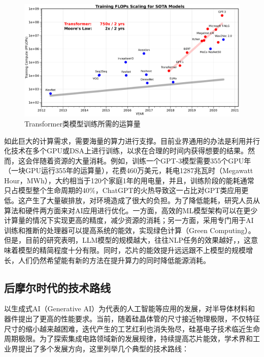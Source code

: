 \begin{figure}[htb]
    \centering
    \includegraphics[width=\textwidth]{figs/AI-Fig-ai_and_compute.pdf}
    \caption{Transformer类模型训练所需的运算量}
    \label{AI:ai_and_compute}
\end{figure}


如此巨大的计算需求，需要海量的算力进行支撑。目前业界通用的办法是利用并行化技术在多个GPU或DSA上进行训练，以求在合理的时间内获得想要的结果。然而，这会伴随着资源的大量消耗。例如，训练一个GPT-3模型需要355个GPU年（一块GPU运行355年的运算量），花费460万美元，耗电1287兆瓦时（Megawatt Hour，MWh），大约相当于120个家庭1年的用电量\cite{AI:carbon_google_2021,AI:zeus}，并且，训练阶段的能耗通常只占模型整个生命周期的40\%\cite{AI:carbon_google_2022}，ChatGPT的火热导致这一占比对GPT类应用更低。这产生了大量碳排放，对环境造成了很大的负担。为了降低能耗，研究人员从算法和硬件两方面来对AI应用进行优化。一方面，高效的ML模型架构可以在更少计算量的情况下实现更高的精度，减少资源的消耗；另一方面，采用专门用于AI训练和推断的处理器可以提高系统的能效，实现绿色计算（Green Computing）\cite{AI:green_computing}。但是，目前的研究表明，LLM模型的规模越大，往往NLP任务的效果越好，\cite{AI:llm_overview}，这意味着模型的精简程度十分有限。同时，芯片的能效提升远远跟不上模型的规模增长，人们仍然希望能有新的方法在提升算力的同时降低能源消耗。


\subsection{后摩尔时代的技术路线}

以生成式AI（Generative AI）为代表的人工智能等应用的发展，对半导体材料和器件提出了更高的性能要求。当前，随着硅晶体管的尺寸接近物理极限，不仅特征尺寸的缩小越来越困难，迭代产生的工艺红利也消失殆尽，硅基电子技术临近生命周期极限。为了探索集成电路领域新的发展规律，持续提高芯片能效，学术界和工业界提出了多个发展方向，这里列举几个典型的技术路线：

